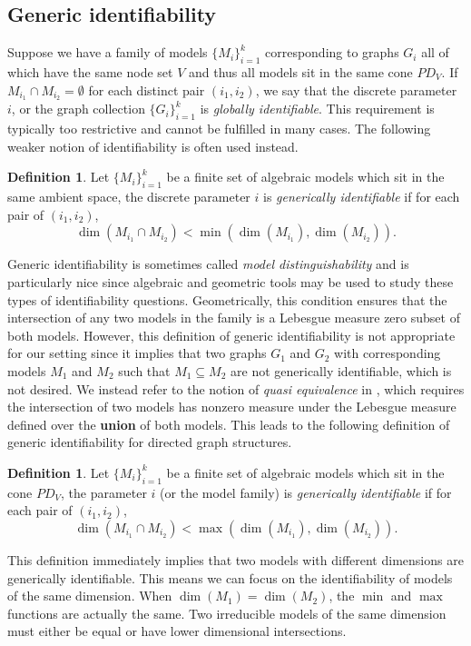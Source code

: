 \documentclass[12pt,reqno]{amsart}
\theoremstyle{plain}
\theoremstyle{definition}
\newtheorem{definition}[theorem]{Definition}
\begin{document}
\subsection{Generic identifiability}
Suppose we have a family of models $\{M_{{i}}\}^k_{i=1}$ corresponding to graphs $G_i$ all of which have the same node set $V$ and thus all models sit in the same cone $PD_V$. 
If $M_{{i_1}}\cap M_{{i_2}}=\emptyset$ for each distinct pair $(i_1,i_2)$, %
we say that the discrete parameter $i$, or the graph collection $\{G_i\}_{i=1}^k$ is \emph{globally identifiable}. This requirement is typically too restrictive and cannot be fulfilled in many cases. The following weaker notion of identifiability is often used instead. 

\begin{definition}
Let $\{M_{{i}}\}^k_{i=1}$ be a finite set of algebraic models which sit in the same ambient space, the discrete parameter $i$ is \emph{generically identifiable} if for each pair of $(i_1,i_2)$, 
$$
\dim(M_{{i_1}}\cap M_{{i_2}})<\min\left(\dim(M_{{i_1}}),\dim(M_{{i_2}})\right).
$$
\end{definition}

Generic identifiability is sometimes called \emph{model distinguishability} \cite[Section 16]{ASseth} and is particularly nice since algebraic and geometric tools may be used to study these types of identifiability questions. Geometrically, this condition ensures that the intersection of any two models in the family is a Lebesgue measure zero subset of both models. However, this definition of generic identifiability is not appropriate for our setting since it implies that two graphs $G_1$ and $G_2$ with corresponding models $M_1$ and $M_2$ such that $M_1 \subseteq M_2$
are not generically identifiable, which is not desired. We instead refer to the notion of \emph{quasi equivalence} in \cite{CDE19,NEURIPS2020spar}, which requires the intersection of two models has nonzero measure under the Lebesgue measure defined over the \textbf{union} of both models. This leads to the following definition of generic identifiability for directed graph structures. 
\begin{definition}
Let $\{M_{{i}}\}^k_{i=1}$ be a finite set of algebraic models which sit in the cone $PD_V$, the parameter $i$ (or the model family) is \emph{generically identifiable} if for each pair of $(i_1,i_2)$, 
$$
\dim(M_{{i_1}}\cap M_{{i_2}})<\max\left(\dim(M_{{i_1}}),\dim(M_{{i_2}})\right).
$$
\end{definition}
This definition immediately implies that two models with different dimensions are generically identifiable. This means we can focus on the identifiability of models of the same dimension. When $\dim(M_1)=\dim(M_2)$, the $\min$ and $\max$ functions are actually the same. Two irreducible models of the same dimension must either be equal or have lower dimensional intersections. 
\end{document}
